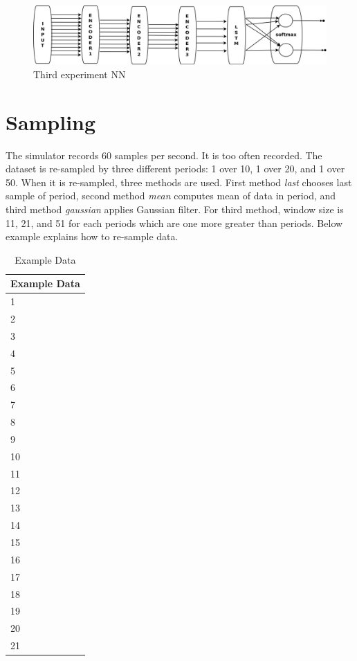\documentclass[draft,dvipsnames]{drexel-thesis}
\begin{document}
\begin{thesis}
\begin{figure}[t!]
    \centering
    \includegraphics[width=\textwidth]{pictures/figures/exp_NN3.png}
    \caption{Third experiment NN}
    \label{fig:exp_NN3}
\end{figure}


\section{Sampling}
The simulator records 60 samples per second. It is too often recorded. The dataset is re-sampled by three different periods: 1 over 10, 1 over 20, and 1 over 50. When it is re-sampled, three methods are used. First method {\em last} chooses last sample of period, second method {\em mean} computes mean of data in period, and third method {\em gaussian} applies Gaussian filter. For third method, window size is 11, 21, and 51 for each periods which are one more greater than periods. Below example explains how to re-sample data.

\begin{table}[!t]
\centering
\caption{Example Data}
\label{tbl:example_data}
\begin{tabular}{|l|}
\hline
Example Data \\ \hline
1            \\
2            \\
3            \\
4            \\
5            \\
6            \\
7            \\
8            \\
9            \\
10           \\
11           \\
12           \\
13           \\
14           \\
15           \\
16           \\
17           \\
18           \\
19           \\
20           \\
21           \\ \hline
\end{tabular}
\end{table}


\end{thesis}
\end{document}
